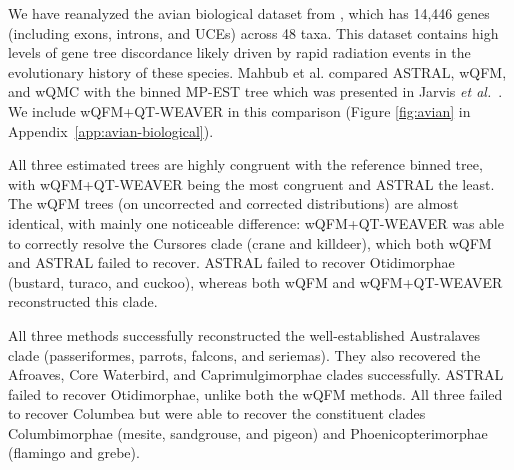 \documentclass[10pt,a4paper]{article}
\begin{document}
We have reanalyzed the avian biological dataset from \cite{jarvis2014}, which has 14,446 genes (including exons, introns, and UCEs) across 48 taxa. This dataset contains high levels of gene tree discordance likely driven by rapid radiation events in the evolutionary history of these species. Mahbub et al. \cite{wqfm} compared ASTRAL, wQFM, and wQMC with the binned MP-EST tree which was presented in Jarvis \textit{et al.}~\cite{jarvis2014}. We include wQFM+QT-WEAVER in this comparison (Figure \ref{fig:avian} in Appendix~\ref{app:avian-biological}). %



All three estimated trees are highly congruent with the reference binned tree, with wQFM+QT-WEAVER being the most congruent and ASTRAL the least. %
The wQFM trees (on uncorrected and corrected distributions) are almost identical, with mainly one noticeable difference: wQFM+QT-WEAVER was able to correctly resolve the Cursores clade (crane and killdeer), which both wQFM and ASTRAL failed to recover. ASTRAL failed to recover Otidimorphae (bustard, turaco, and cuckoo), whereas both wQFM and wQFM+QT-WEAVER reconstructed this clade.

All three methods successfully reconstructed the well-established Australaves clade (passeriformes, parrots, falcons, and seriemas). They also recovered the Afroaves, Core Waterbird, and Caprimulgimorphae clades successfully.
ASTRAL failed to recover Otidimorphae, unlike both the wQFM methods.  All three failed to recover Columbea but were able to recover the constituent clades Columbimorphae (mesite, sandgrouse, and pigeon) and Phoenicopterimorphae (flamingo and grebe).
\end{document}

